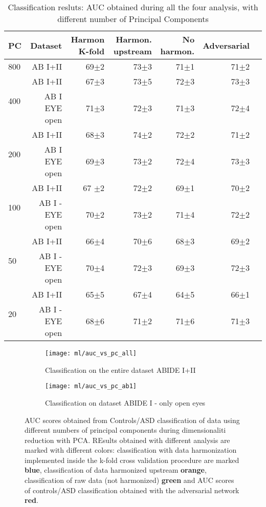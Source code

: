 \documentclass[11pt]{report}
\begin{document}
\begin{table}[!htp]\centering
\scriptsize
\begin{tabular}{lrrrrrr}\toprule
PC &Dataset &Harmon K-fold &Harmon. upstream &No harmon. &Adversarial \\\midrule
800 &AB I+II &69$\pm$2 &73$\pm$3 &71$\pm$1 &71$\pm$2 \\
\hline
\multirow{2}{*}{400} &AB I+II &67$\pm$3 &73$\pm$5 &72$\pm$3 &73$\pm$3 \\
&AB I EYE open &71$\pm$3 &72$\pm$3 &71$\pm$3 &72$\pm$4 \\
\hline
\multirow{2}{*}{200} &AB I+II &68$\pm$3 &74$\pm$2 &72$\pm$2 &71$\pm$2 \\
&AB I EYE open &69$\pm$3 &73$\pm$2 &72$\pm$4 &73$\pm$3 \\
\hline
\multirow{2}{*}{100} &AB I+II &67 $\pm$2 &72$\pm$2 &69$\pm$1 &70$\pm$2 \\
&AB I - EYE open &70$\pm$2 &73$\pm$2 &71$\pm$4 &72$\pm$2 \\
\hline
\multirow{2}{*}{50} &AB I+II &66$\pm$4 &70$\pm$6 &68$\pm$3 &69$\pm$2 \\
&AB I - EYE open &70$\pm$4 &72$\pm$3 &69$\pm$3 &72$\pm$3 \\
\hline
\multirow{2}{*}{20} &AB I+II &65$\pm$5 &67$\pm$4 &64$\pm$5 &66$\pm$1 \\
&AB I - EYE open &68$\pm$6 &71$\pm$2 &71$\pm$6 &71$\pm$3 \\
\bottomrule
\end{tabular}
\caption{Classification resluts: AUC obtained during all the four analysis, with different number of Principal Components}
\label{tab:classification_pearson_pca}
\end{table}





\begin{figure}
\centering
\begin{subfigure}{0.4\textwidth}
   \texttt{[image: ml/auc\_vs\_pc\_all]}
   \caption{Classification on the entire dataset ABIDE I+II}
   \label{}
\end{subfigure}
\begin{subfigure}{0.4\textwidth}
   \texttt{[image: ml/auc\_vs\_pc\_ab1]}
   \caption{Classification on dataset ABIDE I - only open eyes}
   \label{}
\end{subfigure}
\caption{AUC scores obtained from Controls/ASD classification of data using different numbers of principal components during dimensionaliti reduction with PCA.
REsults obtained with different analysis are marked with different colors: classification with data harmonization implemented inside the k-fold cross validation procedure are marked \textbf{blue}, classification of data harmonized upstream \textbf{orange}, classification of raw data (not harmonized) \textbf{green} and AUC scores of controls/ASD classification obtained with the adversarial network \textbf{red}.
}
\label{fig:classification_pearson_pca}
\end{figure}
\end{document}
